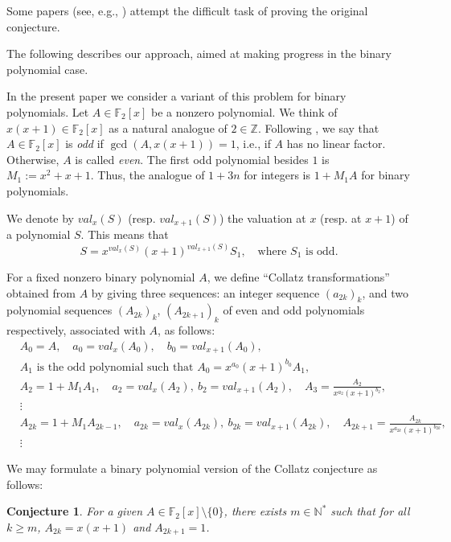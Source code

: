 \documentclass [12pt]{article}
\newtheorem{conjecture}[theorem]{Conjecture}
\begin{document}
Some papers (see, e.g., \cite{Furuta,Izadi}) attempt the difficult task of proving the original conjecture.

The following describes our approach, aimed at making progress in the binary polynomial case.

In the present paper we consider a variant of this problem for binary polynomials. Let $A \in \mathbb{F}_2[x]$ be a nonzero polynomial. We think of $x(x+1) \in \mathbb{F}_2[x]$ as a natural analogue of $2 \in \mathbb{Z}$. Following \cite{Gall-Rahav2007}, we say that $A \in \mathbb{F}_2[x]$ is \emph{odd} if $\gcd(A, x(x+1)) = 1$, i.e., if $A$ has no linear factor. Otherwise, $A$ is called \emph{even}. The first odd polynomial besides $1$ is $M_1 := x^2+x+1$. Thus, the analogue of $1+3n$ for integers is $1 + M_1 A$ for binary polynomials.

We denote by $val_x(S)$ (resp. $val_{x+1}(S)$) the valuation at $x$ (resp. at $x+1$) of a polynomial $S$. This means that
\[
S = x^{val_x(S)} (x+1)^{val_{x+1}(S)} S_1, \quad \text{where $S_1$ is odd}.
\]

For a fixed nonzero binary polynomial $A$, we define ``Collatz transformations'' obtained from $A$ by giving three sequences: an integer sequence $(a_{2k})_k$, and two polynomial sequences $(A_{2k})_k$, $(A_{2k+1})_k$ of even and odd polynomials respectively, associated with $A$, as follows:
\[
\begin{aligned}
&A_0 = A, \quad a_0 = val_x(A_0), \quad b_0 = val_{x+1}(A_0), \\
&A_1 \text{ is the odd polynomial such that } A_0 = x^{a_0}(x+1)^{b_0} A_1, \\
&A_2 = 1 + M_1 A_1, \quad a_2 = val_x(A_2), \ b_2 = val_{x+1}(A_2), \quad 
A_3 = \frac{A_2}{x^{a_2}(x+1)^{b_2}}, \\
&\vdots \\
&A_{2k} = 1+M_1 A_{2k-1}, \quad a_{2k}=val_x(A_{2k}), \ b_{2k}=val_{x+1}(A_{2k}), \quad 
A_{2k+1} = \frac{A_{2k}}{x^{a_{2k}}(x+1)^{b_{2k}}}, \\
&\vdots
\end{aligned}
\]

We may formulate a binary polynomial version of the Collatz conjecture as follows:

\begin{conjecture}\label{collatzconject}
For a given $A \in \mathbb{F}_2[x] \setminus \{0\}$, there exists $m \in \mathbb{N}^*$ such that for all $k \geq m$, $A_{2k} = x(x+1)$ and $A_{2k+1} = 1$.
\end{conjecture}
\end{document}
